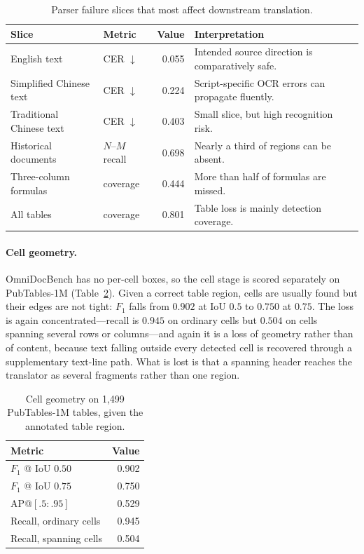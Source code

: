 \begin{table}[H]
\centering
\caption{Parser failure slices that most affect downstream translation.}
\label{tab:res-risk-slices}
\small
\setlength{\tabcolsep}{5pt}
\begin{tabularx}{\textwidth}{@{}l l r >{\raggedright\arraybackslash}X@{}}
\toprule
\textbf{Slice} & \textbf{Metric} & \textbf{Value} & \textbf{Interpretation} \\
\midrule
English text & CER $\downarrow$ & 0.055 & Intended source direction is comparatively safe. \\
Simplified Chinese text & CER $\downarrow$ & 0.224 & Script-specific OCR errors can propagate fluently. \\
Traditional Chinese text & CER $\downarrow$ & 0.403 & Small slice, but high recognition risk. \\
Historical documents & $N$--$M$ recall & 0.698 & Nearly a third of regions can be absent. \\
Three-column formulas & coverage & 0.444 & More than half of formulas are missed. \\
All tables & coverage & 0.801 & Table loss is mainly detection coverage. \\
\bottomrule
\end{tabularx}
\end{table}

\paragraph{Cell geometry.} OmniDocBench has no per-cell boxes, so the cell stage is scored
separately on PubTables-1M (Table~\ref{tab:res-cells}). Given a correct table region,
cells are usually found but their edges are not tight: $F_1$ falls from $0.902$ at IoU
$0.5$ to $0.750$ at $0.75$. The loss is again concentrated---recall is $0.945$ on ordinary
cells but $0.504$ on cells spanning several rows or columns---and again it is a loss of
geometry rather than of content, because text falling outside every detected cell is
recovered through a supplementary text-line path. What is lost is that a spanning header
reaches the translator as several fragments rather than one region.

\begin{table}[H]
\centering
\caption{Cell geometry on 1{,}499 PubTables-1M tables, given the annotated table region.}
\label{tab:res-cells}
\small
\begin{tabular}{@{}l r@{}}
\toprule
\textbf{Metric} & \textbf{Value} \\
\midrule
$F_1$ @ IoU $0.50$            & 0.902 \\
$F_1$ @ IoU $0.75$            & 0.750 \\
AP@$[.5{:}.95]$               & 0.529 \\
\midrule
Recall, ordinary cells        & 0.945 \\
Recall, spanning cells        & 0.504 \\
\bottomrule
\end{tabular}
\end{table}

